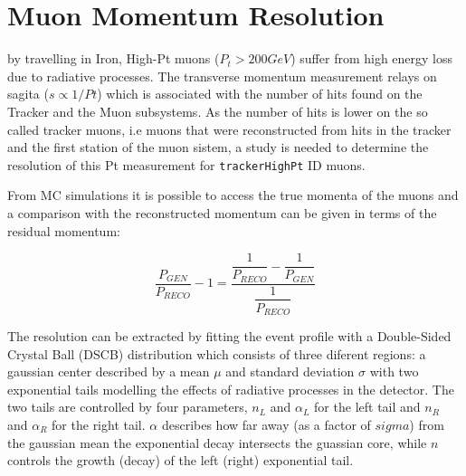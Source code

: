 \section{Muon Momentum Resolution}

by travelling in Iron, High-Pt muons ($P_{t}>200GeV$) suffer from high energy
loss due to radiative processes. The transverse momentum measurement relays on
sagita ($s \propto 1/Pt$) which is associated with the number of hits found on
the Tracker and the Muon subsystems. As the number of hits is lower on the so called
tracker muons, i.e muons that were reconstructed from hits in the tracker and the
first station of the muon sistem, a study is needed to determine
the resolution of this Pt measurement for \verb|trackerHighPt| ID muons.


From MC simulations it is possible to access the true momenta of the muons and
a comparison with the reconstructed momentum can be given in terms of the
residual momentum:

\begin{equation}
  \frac{P_{GEN}}{P_{RECO}} - 1 = \frac{\dfrac{1}{P_{RECO}}-\dfrac{1}{P_{GEN}}}{\dfrac{1}{P_{RECO}}}
\end{equation}

The resolution can be extracted by fitting the event profile with a
Double-Sided Crystal Ball (DSCB) distribution which consists of three diferent regions:
a gaussian center described by a mean $\mu$ and standard deviation $\sigma$ with two
exponential tails modelling the effects of radiative processes in the detector.
The two tails are controlled by four parameters, $n_{L}$ and $\alpha_{L}$ for the
left tail and $n_{R}$ and $\alpha_{R}$ for the right tail. $\alpha$ describes how
far away (as a factor of $sigma$) from the gaussian mean the exponential decay
intersects the guassian core, while $n$ controls the growth (decay) of the
left (right) exponential tail.

